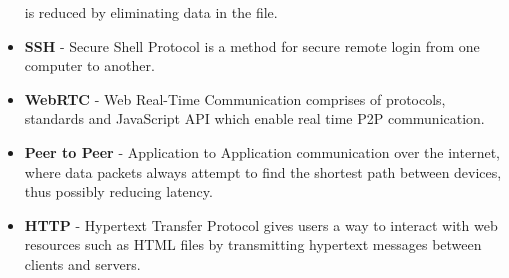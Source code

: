 \begin{itemize}
    is reduced by eliminating data in the file.
    \item \textbf{SSH} - Secure Shell Protocol is a method for secure remote login from 
    one computer to another.
    \item \textbf{WebRTC} - Web Real-Time Communication comprises of protocols, standards and 
    JavaScript API which enable real time P2P communication.
    \item \textbf{Peer to Peer} - Application to Application communication over the internet, 
    where data packets always attempt to find the shortest path between devices, thus possibly reducing latency.
    \item \textbf{HTTP} - Hypertext Transfer Protocol gives users a way to interact with web resources 
    such as HTML files by transmitting hypertext messages between clients and servers.
\end{itemize}
